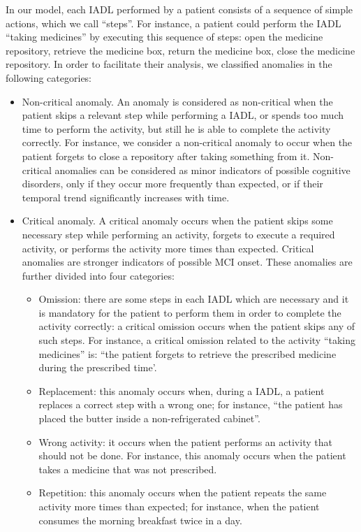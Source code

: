 \documentclass[10pt, conference, compsocconf]{IEEEtran}
\begin{document}
In our model, each IADL performed by a patient consists of a sequence of simple actions, which we call ``steps''. For instance, a patient could perform the IADL ``taking medicines'' by executing this sequence of steps: open the medicine repository, retrieve the medicine box, return the medicine box, close the medicine repository.
In order to facilitate their analysis, we classified anomalies in the following categories:
\begin{itemize}
\item Non-critical anomaly. 
An anomaly is considered as non-critical when the patient skips a relevant step while performing a IADL, or spends too much time to perform the activity, but still he is able to complete the activity correctly. For instance, we consider a non-critical anomaly to occur when the patient forgets to close a repository after taking something from it. Non-critical anomalies can be considered as minor indicators of possible cognitive disorders, only if they occur more frequently than expected, or if their temporal trend significantly increases with time.
\item Critical anomaly. 
A critical anomaly occurs when the patient skips some necessary step while performing an activity, forgets to execute a required activity, or performs the activity more times than expected. Critical anomalies are stronger indicators of possible MCI onset. 
These anomalies are further divided into four categories: \begin{itemize}
\item Omission: 
there are some steps in each IADL which are necessary and it is mandatory for the patient to perform them in order to complete the activity correctly: a critical omission occurs when the patient skips any of such steps.  For instance, a critical omission related to the activity ``taking medicines'' is: ``the patient forgets to retrieve the prescribed medicine during the prescribed time'.
\item Replacement: this anomaly occurs when, during a IADL, a patient replaces a correct step with a wrong one; for instance, ``the patient has placed the butter inside a non-refrigerated cabinet''.
\item Wrong activity: it occurs when the patient performs an activity that should not be done. For instance, this anomaly occurs when the patient takes a medicine that was not prescribed.
\item Repetition: this anomaly occurs when the patient repeats the same activity more times than expected; for instance, when the patient consumes the morning breakfast twice in a day.
\end{itemize}
\end{itemize}
\end{document}
